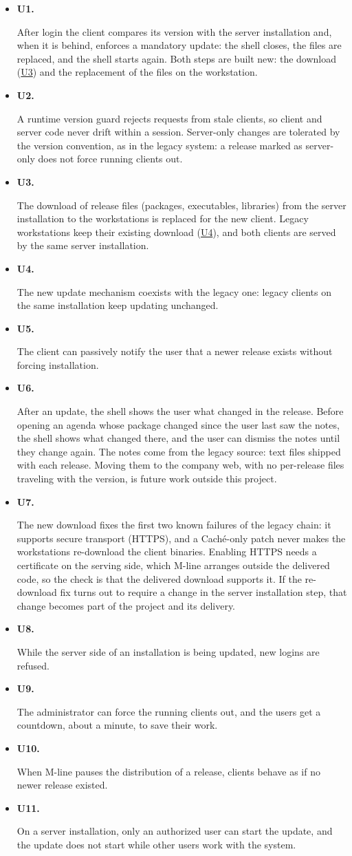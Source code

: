 \documentclass{article}
\newcommand{\reqdef}[1]{\hypertarget{req:#1}{\textbf{#1.}}}
\newcommand{\req}[1]{\hyperlink{req:#1}{#1}}
\begin{document}
\begin{itemize}
  \item \reqdef{U1} After login the client compares its version with the server installation and, when it is behind, enforces a mandatory update: the shell closes, the files are replaced, and the shell starts again. Both steps are built new: the download (\req{U3}) and the replacement of the files on the workstation.
  \item \reqdef{U2} A runtime version guard rejects requests from stale clients, so client and server code never drift within a session. Server-only changes are tolerated by the version convention, as in the legacy system: a release marked as server-only does not force running clients out.
  \item \reqdef{U3} The download of release files (packages, executables, libraries) from the server installation to the workstations is replaced for the new client. Legacy workstations keep their existing download (\req{U4}), and both clients are served by the same server installation.
  \item \reqdef{U4} The new update mechanism coexists with the legacy one: legacy clients on the same installation keep updating unchanged.
  \item \reqdef{U5} The client can passively notify the user that a newer release exists without forcing installation.
  \item \reqdef{U6} After an update, the shell shows the user what changed in the release. Before opening an agenda whose package changed since the user last saw the notes, the shell shows what changed there, and the user can dismiss the notes until they change again. The notes come from the legacy source: text files shipped with each release. Moving them to the company web, with no per-release files traveling with the version, is future work outside this project.
  \item \reqdef{U7} The new download fixes the first two known failures of the legacy chain: it supports secure transport (HTTPS), and a Caché-only patch never makes the workstations re-download the client binaries. Enabling HTTPS needs a certificate on the serving side, which M-line arranges outside the delivered code, so the check is that the delivered download supports it. If the re-download fix turns out to require a change in the server installation step, that change becomes part of the project and its delivery.
  \item \reqdef{U8} While the server side of an installation is being updated, new logins are refused.
  \item \reqdef{U9} The administrator can force the running clients out, and the users get a countdown, about a minute, to save their work.
  \item \reqdef{U10} When M-line pauses the distribution of a release, clients behave as if no newer release existed.
  \item \reqdef{U11} On a server installation, only an authorized user can start the update, and the update does not start while other users work with the system.
\end{itemize}
\end{document}
